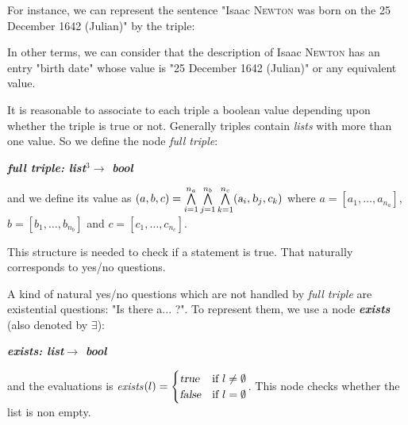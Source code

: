 For instance, we can represent the sentence "Isaac \textsc{Newton} was born on the 25 December 1642 (Julian)" by the triple:
\begin{figure}[!ht]
    \centering
\end{figure}
\FloatBarrier
In other terms, we can consider that the description of Isaac \textsc{Newton} has an entry "birth date" whose value is "25 December 1642 (Julian)" or any equivalent value.

It is reasonable to associate to each triple a boolean value depending upon whether the triple is true or not. Generally triples contain \textsl{lists} with more than one value. So we define the node \textsl{full triple}:
\begin{center}
\textsl{\bf full triple: list$^3\rightarrow$ bool}
\end{center}
and we define its value as $(a,b,c)=\bigwedge\limits_{i=1}^{n_a}\bigwedge\limits_{j=1}^{n_b}\bigwedge\limits_{k=1}^{n_c} (\textsl{a}_i,\textsl{b}_j,\textsl{c}_k)$ where $a=[a_1,\ldots,a_{n_a}]$, $b=[b_1,\ldots,b_{n_b}]$ and $c=[c_1,\ldots,c_{n_c}]$.

This structure is needed to check if a statement is true. That naturally corresponds to yes/no questions.

A kind of natural yes/no questions which are not handled by \textsl{full triple} are existential questions: "Is there a... ?". To represent them, we use a node \textsl{\bf exists} (also denoted by $\exists$):
\begin{center}
\textsl{\bf exists: list$\rightarrow$ bool}
\end{center}
and the evaluations is \textsl{exists$(l) = \begin{cases}
\textsl{true} & \text{if }l\neq\emptyset\\
\textsl{false} & \text{if }l=\emptyset
\end{cases}$}. This node checks whether the list is non empty.

